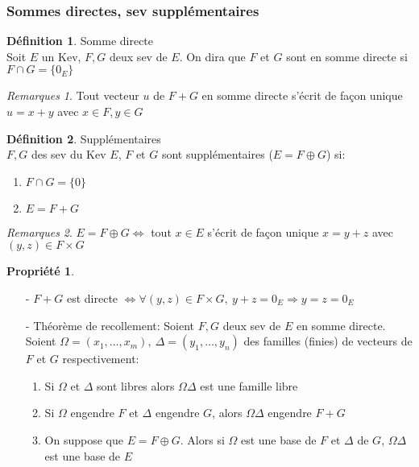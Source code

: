 \documentclass[fleqn]{article}
\theoremstyle{definition} \newtheorem*{defi}{D\'efinition}
\theoremstyle{definition} \newtheorem*{theo}{Th\'eor\`eme}
\theoremstyle{definition} \newtheorem*{coro}{Corollaire}
\theoremstyle{definition} \newtheorem*{nota}{Notation}
\theoremstyle{remark} \newtheorem*{rqs}{Remarques}
\theoremstyle{definition} \newtheorem*{prop}{Propri\'et\'e}
\begin{document}
\subsubsection{Sommes directes, sev suppl\'ementaires}
\begin{defi} Somme directe \\
	Soit $E$ un Kev, $F,G$ deux sev de $E$. On dira que $F$ et $G$ sont en somme directe si $F \cap G = \{0_E\}$
	\begin{rqs}
		Tout vecteur $u$ de $F+G$ en somme directe s'\'ecrit de fa\c{c}on unique $u = x + y$ avec $x \in F, y \in G$
	\end{rqs}
\end{defi}

\begin{defi} Suppl\'ementaires \\
	$F,G$ des sev du Kev $E$, $F$ et $G$ sont suppl\'ementaires ($E = F \oplus G$) si:
	\begin{enumerate}
		\item $F \cap G = \{0\}$
		\item $E = F + G$
	\end{enumerate}

	\begin{rqs}
		$E = F \oplus G \Leftrightarrow $ tout $x \in E$ s'\'ecrit de fa\c{c}on unique $x=y+z$ avec $(y,z) \in F \times G$
	\end{rqs}
\end{defi}

\begin{prop} $ $
	\begin{itemize}
		\item [-] $F+G$ est directe $\Leftrightarrow \forall (y,z) \in F \times G,\ y + z = 0_E \Rightarrow y = z = 0_E$
		\item [-] Th\'eor\`eme de recollement:
			Soient $F,G$ deux sev de $E$ en somme directe. Soient $\Omega = (x_1, \hdots, x_m),\ \Delta = (y_1, \hdots, y_n)$ des familles
			(finies) de vecteurs de $F$ et $G$ respectivement:
			\begin{enumerate}
				\item Si $\Omega$ et $\Delta$ sont libres alors $\Omega \Delta$ est une famille libre
				\item Si $\Omega$ engendre $F$ et $\Delta$ engendre $G$, alors $\Omega \Delta$ engendre $F+G$
				\item On suppose que $E = F \oplus G$. Alors si $\Omega$ est une base de $F$ et $\Delta$ de $G$, $\Omega \Delta$ est une base
					de $E$
			\end{enumerate}
	\end{itemize}
\end{prop}
\end{document}

